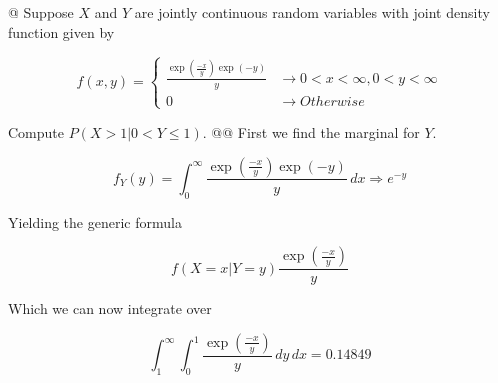 \documentclass[11pt]{article}\usepackage[]{graphicx}\usepackage[]{xcolor}
\begin{document}
\begin{easylist}[enumerate]
    @ Suppose $X$ and $Y$ are jointly continuous random variables with joint density function given by

    \[
        f(x, y) =
        \begin{cases}
            \frac{\exp\left( \frac{-x}{y} \right) \exp\left( -y \right)}{y} &\to 0 < x < \infty, 0 < y < \infty\\
            0 &\to Otherwise
        \end{cases}
    \]

    Compute $P\left( X > 1 | 0 < Y \le 1 \right)$.
    @@ First we find the marginal for $Y$.

    \[
        f_Y(y) = \int_0^\infty \frac{\exp\left( \frac{-x}{y} \right) \exp\left( -y \right)}{y} \, dx \Rightarrow
            e^{-y}
    \]

    Yielding the generic formula

    \[
        f\left( X=x|Y=y \right)
            \frac{\exp\left( \frac{-x}{y} \right)}{y}
    \]

    Which we can now integrate over

    \[
        \int_1^\infty \int_0^1 \frac{\exp\left( \frac{-x}{y} \right)}{y} \, dy \, dx = 0.14849
    \]

\end{easylist}
\end{document}
